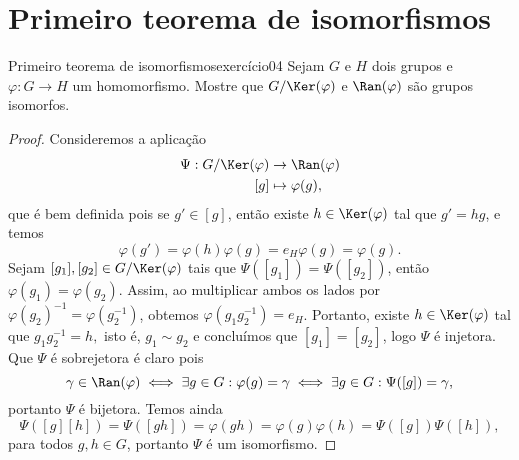 \section{Primeiro teorema de isomorfismos}
\begin{proposition}{Primeiro teorema de isomorfismos}{exercício04}
    Sejam \(G\) e \(H\) dois grupos e \(\varphi : G \to H\) um homomorfismo. Mostre que \(G/\Ker(\varphi)\) e \(\Ran(\varphi)\) são grupos isomorfos.
\end{proposition}
\begin{proof}
    Consideremos a aplicação
    \begin{align*}
        \Psi : G/\Ker(\varphi) &\to \Ran(\varphi)\\
                           [g] &\mapsto \varphi(g),
    \end{align*}
    que é bem definida pois se \(g' \in [g]\), então existe \(h \in \Ker(\varphi)\) tal que \(g' = h g\), e temos
    \begin{equation*}
        \varphi(g') = \varphi(h)\varphi(g) = e_H\varphi(g) = \varphi(g).
    \end{equation*}
    Sejam \([g_1], [g_2] \in G/\Ker(\varphi)\) tais que \(\Psi([g_1]) = \Psi([g_2])\), então \(\varphi(g_1) = \varphi(g_2)\). Assim, ao multiplicar ambos os lados por \(\varphi(g_2)^{-1} = \varphi(g_2^{-1})\), obtemos \(\varphi(g_1 g_2^{-1}) = e_H\). Portanto, existe \(h \in \Ker(\varphi)\) tal que \(g_1 g_2^{-1} = h,\) isto é, \(g_1 \sim g_2\) e concluímos que \([g_1] = [g_2]\), logo \(\Psi\) é injetora. Que \(\Psi\) é sobrejetora é claro pois
    \begin{equation*}
        \gamma \in \Ran(\varphi) \iff \exists g \in G : \varphi(g) = \gamma \iff \exists g \in G : \Psi([g]) = \gamma,
    \end{equation*}
    portanto \(\Psi\) é bijetora. Temos ainda
    \begin{equation*}
        \Psi([g][h]) = \Psi([gh]) = \varphi(gh) = \varphi(g)\varphi(h) = \Psi([g])\Psi([h]),
    \end{equation*}
    para todos \(g, h \in G\), portanto \(\Psi\) é um isomorfismo.
\end{proof}
